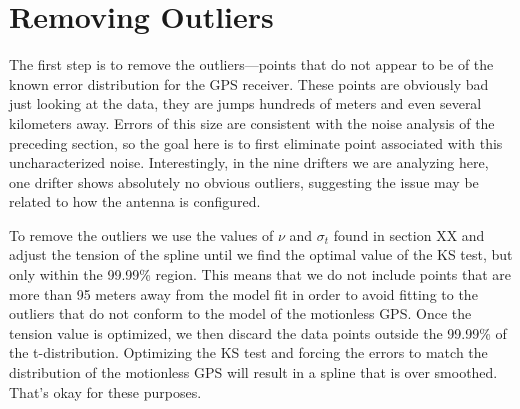 \documentclass[twocol]{ametsoc}
\begin{document}
\section{Removing Outliers}

The first step is to remove the outliers---points that do not appear to be of the known error distribution for the GPS receiver. These points are obviously bad just looking at the data, they are jumps hundreds of meters and even several kilometers away. Errors of this size are consistent with the noise analysis of the preceding section, so the goal here is to first eliminate point associated with this uncharacterized noise. Interestingly, in the nine drifters we are analyzing here, one drifter shows absolutely no obvious outliers, suggesting the issue may be related to how the antenna is configured.

To remove the outliers we use the values of $\nu$ and $\sigma_t$ found in section XX and adjust the tension of the spline until we find the optimal value of the KS test, but only within the 99.99\% region. This means that we do not include points that are more than 95 meters away from the model fit in order to avoid fitting to the outliers that do not conform to the model of the motionless GPS. Once the tension value is optimized, we then discard the data points outside the 99.99\% of the t-distribution. Optimizing the KS test and forcing the errors to match the distribution of the motionless GPS will result in a spline that is over smoothed. That's okay for these purposes.
\end{document}
